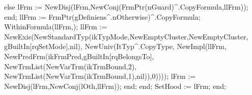                   else lFrm := NewDisj(lFrm,NewConj(FrmPtr(nGuard)^.CopyFormula,llFrm));
               end;
            llFrm := FrmPtr(gDefiniens^.nOtherwise)^.CopyFormula;
            WithinFormula(llFrm,);
            llFrm := NewExis(NewStandardTyp(ikTypMode,NewEmptyCluster,NewEmptyCluster,
                                            gBuiltIn[rqSetMode],nil),
                             NewUniv(ItTyp^.CopyType,
                                     NewImpl(llFrm,
                                             NewPredFrm(ikFrmPred,gBuiltIn[rqBelongsTo],
                                                        NewTrmList(NewVarTrm(ikTrmBound,2),
                                                                   NewTrmList(NewVarTrm(ikTrmBound,1),nil)),0))));
            lFrm := NewDisj(lFrm,NewConj(lOth,llFrm));
         end;
      end;
      SetHood := lFrm;
   end;
   
